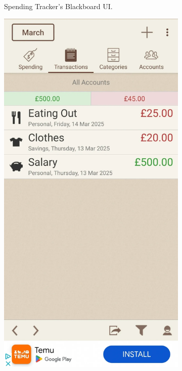 \documentclass{l4proj}
\begin{document}
\begin{appendices}
\begin{figure}[h]
\begin{subfigure}[t]{0.25\textwidth}
        \caption{Spending Tracker's Blackboard UI.}
        \label{fig:syn1}
    \end{subfigure}
    \hspace{0.5cm}
    \begin{subfigure}[t]{0.25\textwidth}
        \vspace{0pt}
        \includegraphics[width=\textwidth]{images/App-Comparison/spending-tracker-ss-2.png} 

\end{subfigure}
\end{figure}
\end{appendices}
\end{document}

